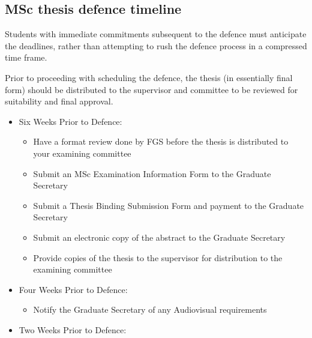 \documentclass[12pt]{article}
\begin{document}
\subsection{MSc thesis defence timeline}

Students with immediate commitments subsequent to the defence must anticipate
the deadlines, rather than attempting to rush the defence process in a
compressed time frame.

Prior to proceeding with scheduling the defence, the thesis (in essentially
final form) should be distributed to the supervisor and committee to be
reviewed for suitability and final approval.

\begin{itemize}
    \item Six Weeks Prior to Defence:

        \begin{itemize}

            \item Have a format review done by FGS before the thesis is
                distributed to your examining committee

            \item Submit an MSc Examination Information Form to the Graduate
                Secretary

            \item Submit a Thesis Binding Submission Form and payment to the
                Graduate Secretary

            \item Submit an electronic copy of the abstract to the Graduate
                Secretary

            \item Provide copies of the thesis to the supervisor for
                distribution to the examining committee

        \end{itemize}

    \item Four Weeks Prior to Defence:
        \begin{itemize}

            \item Notify the Graduate Secretary of any Audiovisual requirements

        \end{itemize}

    \item Two Weeks Prior to Defence:
        \begin{itemize}


\end{itemize}
\end{itemize}
\end{document}
